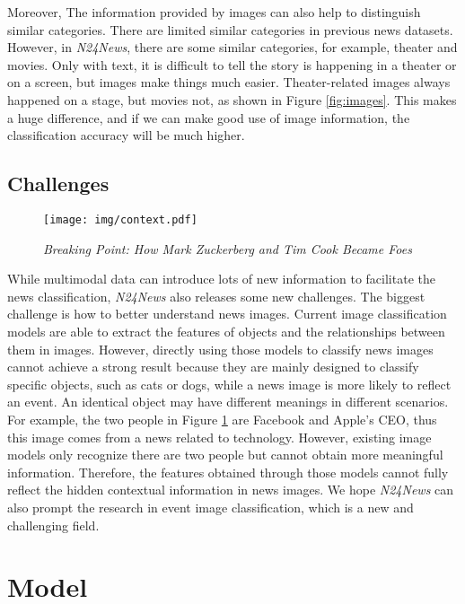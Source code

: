 \documentclass[10pt, a4paper]{article}
\begin{document}
Moreover, The information provided by images can also help to distinguish similar categories. 
There are limited similar categories in previous news datasets. However, in \textit{N24News}, there are some similar categories, for example, theater and movies. Only with text, it is difficult to tell the story is happening in a theater or on a screen, but images make things much easier. Theater-related images always happened on a stage, but movies not, as shown in Figure \ref{fig:images}. This makes a huge difference, and if we can make good use of image information, the classification accuracy will be much higher.

\subsection{Challenges}

\begin{figure}[]
    \centering
    \texttt{[image: img/context.pdf]}
    \caption{\textit{Breaking Point: How Mark Zuckerberg and Tim Cook Became Foes}}
    \label{fig:context}
\end{figure}

While multimodal data can introduce lots of new information to facilitate the news classification, \textit{N24News} also releases some new challenges. The biggest challenge is how to better understand news images. 
Current image classification models are able to extract the features of objects and the relationships between them in images. 
However, directly using those models to classify news images cannot achieve a strong result because they are mainly designed to classify specific objects, such as cats or dogs, while a news image is more likely to reflect an event. An identical object may have different meanings in different scenarios. For example, the two people in Figure \ref{fig:context} are Facebook and Apple’s CEO, thus this image comes from a news related to technology. However, existing image models only recognize there are two people but cannot obtain more meaningful information. Therefore, the features obtained through those models cannot fully reflect the hidden contextual information in news images. We hope \textit{N24News} can also prompt the research in event image classification, which is a new and challenging field.




\section{Model}
\end{document}

